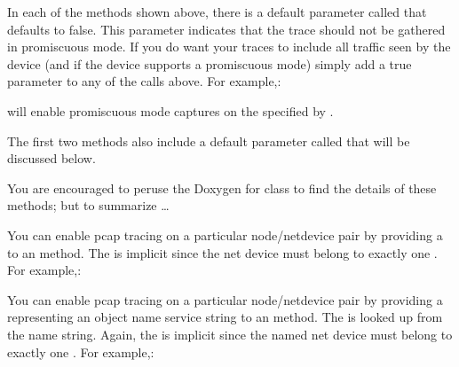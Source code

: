 \documentclass[letterpaper,10pt,english]{sphinxmanual}
\renewcommand{\sphinxcode}[1]{\texttt{\small{#1}}}
\begin{document}
In each of the methods shown above, there is a default parameter called
\sphinxcode{} that defaults to false. This parameter indicates that the trace
should not be gathered in promiscuous mode. If you do want your traces to
include all traffic seen by the device (and if the device supports a promiscuous
mode) simply add a true parameter to any of the calls above. For example,:

\begin{sphinxVerbatim}[commandchars=\\\{\}]
 
   
\end{sphinxVerbatim}

will enable promiscuous mode captures on the \sphinxcode{} specified by \sphinxcode{}.

The first two methods also include a default parameter called
\sphinxcode{} that will be discussed below.

You are encouraged to peruse the Doxygen for class \sphinxcode{} to
find the details of these methods; but to summarize …

You can enable pcap tracing on a particular node/net\sphinxhyphen{}device pair by providing a
\sphinxcode{\sphinxupquote{Ptr\textless{}NetDevice\textgreater{}}} to an \sphinxcode{} method. The \sphinxcode{} is implicit
since the net device must belong to exactly one \sphinxcode{}. For example,:

\begin{sphinxVerbatim}[commandchars=\\\{\}]
 
  
\end{sphinxVerbatim}

You can enable pcap tracing on a particular node/net\sphinxhyphen{}device pair by providing a
\sphinxcode{} representing an object name service string to an \sphinxcode{}
method.  The \sphinxcode{\sphinxupquote{Ptr\textless{}NetDevice\textgreater{}}} is looked up from the name string.  Again, the
\sphinxcode{} is implicit since the named net device must belong to exactly one
\sphinxcode{}.  For example,:
\end{document}
